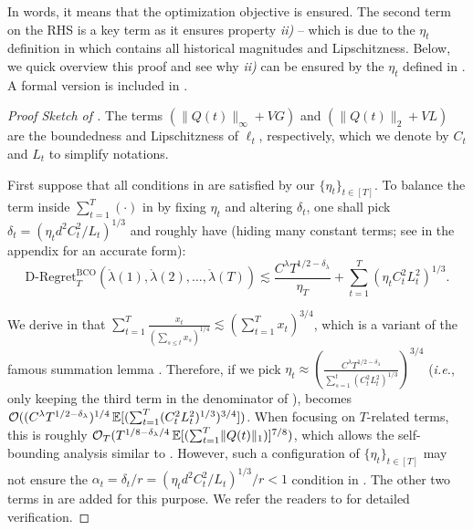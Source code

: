 \documentclass[11pt,fullpage,letterpaper]{article} %
\renewcommand{\bm}[1]{#1}%
\renewcommand{\O}{\operatorname{\mathcal O}}
\newcommand{\E}{\operatornamewithlimits{\mathbb{E}}}
\begin{document}
In words, it means that the optimization objective  is ensured.
The second term on the RHS is a key term as it ensures property \textit{ii)} -- which is due to the $\eta_t$ definition in  which contains all historical magnitudes and Lipschitzness.
Below, we quick overview this proof and see why \textit{ii)} can be ensured by the $\eta_t$ defined in . A formal version is included in .

\begin{proof}[Proof Sketch of ]
The terms $(\lVert \bm Q(t)\rVert_\infty+VG)$ and $(\lVert \bm Q(t)\rVert_2+VL)$ are the boundedness and Lipschitzness of $\ell_t$, respectively, which we denote by $C_t$ and $L_t$ to simplify notations.

First suppose that all conditions in  are satisfied by our $\{\eta_t\}_{t\in [T]}$.
To balance the term inside $\sum_{t=1}^T (\cdot)$ in  by fixing $\eta_t$ and altering $\delta_t$, one shall pick $\delta_t=(\eta_t d^2 C_t^2 / L_t)^{1/3}$ and roughly have (hiding many constant terms; see  in the appendix for an accurate form):
\begin{equation}\label{eq:BCO regret decomposition informal}
\text{D-Regret}_T^{\text{BCO}}(\mathring{\bm \lambda}(1),\mathring{\bm \lambda}(2),\ldots,\mathring{\bm \lambda}(T))\lesssim \frac{C^\lambda T^{1/2-\delta_\lambda}}{\eta_T} + \sum_{t=1}^T \left (\eta_t C_t^2 L_t^2\right )^{1/3}.
\end{equation}

We derive in  that $\sum_{t=1}^T \frac{x_t}{(\sum_{s\le t} x_s)^{1/4}}\lesssim (\sum_{t=1}^T x_t)^{3/4}$, which is a variant of the famous summation lemma \citep{auer2002nonstochastic}.
Therefore, if we pick $\eta_t\approx \left (\frac{C^\lambda T^{1/2-\delta_\lambda}}{\sum_{s=1}^t (C_t^2 L_t^2)^{1/3}}\right )^{3/4}$ (\textit{i.e.}, only keeping the third term in the denominator of ),  becomes $\O((C^\lambda T^{1/2-\delta_\lambda})^{1/4} \E[(\sum_{t=1}^T (C_t^2 L_t^2)^{1/3})^{3/4}])$.
When focusing on $T$-related terms, this is roughly $\O_T(T^{1/8-\delta_\lambda/4} \E[(\sum_{t=1}^T \lVert \bm Q(t)\rVert_1)]^{7/8})$, which allows the self-bounding analysis similar to .
However, such a configuration of $\{\eta_t\}_{t\in [T]}$ may not ensure the $\alpha_t = \delta_t / r = (\eta_t d^2 C_t^2 / L_t)^{1/3}/r<1$ condition in .
The other two terms in  are added for this purpose. We refer the readers to  for detailed verification.
\end{proof}
\end{document}
